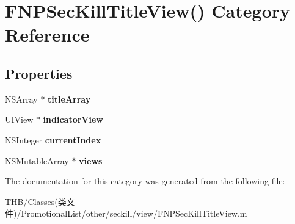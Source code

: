 \hypertarget{category_f_n_p_sec_kill_title_view_07_08}{}\section{F\+N\+P\+Sec\+Kill\+Title\+View() Category Reference}
\label{category_f_n_p_sec_kill_title_view_07_08}
\subsection*{Properties}
\begin{DoxyCompactItemize}
\item 
\mbox{\label{category_f_n_p_sec_kill_title_view_07_08_a8efbaf54386416d0353133106022a23a}} 
N\+S\+Array $\ast$ {\bfseries title\+Array}
\item 
\mbox{\label{category_f_n_p_sec_kill_title_view_07_08_a8adda39153728e313f5af0afc29a1bba}} 
U\+I\+View $\ast$ {\bfseries indicator\+View}
\item 
\mbox{\label{category_f_n_p_sec_kill_title_view_07_08_a9e8f0c36bed81b46bd6746efa6141714}} 
N\+S\+Integer {\bfseries current\+Index}
\item 
\mbox{\label{category_f_n_p_sec_kill_title_view_07_08_a547ed4bc672949e7f0db5dbb580ad1d6}} 
N\+S\+Mutable\+Array $\ast$ {\bfseries views}
\end{DoxyCompactItemize}


The documentation for this category was generated from the following file\+:\begin{DoxyCompactItemize}
\item 
T\+H\+B/\+Classes(类文件)/\+Promotional\+List/other/seckill/view/F\+N\+P\+Sec\+Kill\+Title\+View.\+m\end{DoxyCompactItemize}

